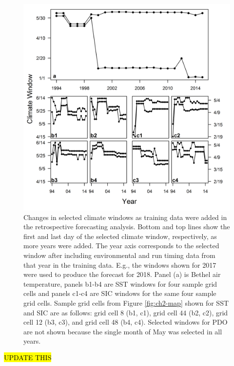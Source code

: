 \documentclass[12pt,]{book}
\theoremstyle{definition}
\theoremstyle{definition}
\theoremstyle{definition}
\theoremstyle{remark}
\begin{document}
\begin{figure}
  \centering
  \includegraphics{img/Ch2/window-changes.png}
  \caption{Changes in selected climate windows as training data were added in the retrospective forecasting analysis. Bottom and top lines show the first and last day of the selected climate window, respectively, as more years were added. The year axis corresponds to the selected window after including environmental and run timing data from that year in the training data. E.g., the windows shown for 2017 were used to produce the forecast for 2018. Panel (a) is Bethel air temperature, panels b1-b4 are SST windows for four sample grid cells and panels c1-c4 are SIC windows for the same four sample grid cells. Sample grid cells from Figure \ref{fig:ch2-map} shown for SST and SIC are as follows: grid cell 8 (b1, c1), grid cell 44 (b2, c2), grid cell 12 (b3, c3), and grid cell 48 (b4, c4). Selected windows for PDO are not shown because the single month of May was selected in all years.}
  \label{fig:window-changes}
\end{figure}

\clearpage

\hl{UPDATE THIS}
\end{document}
